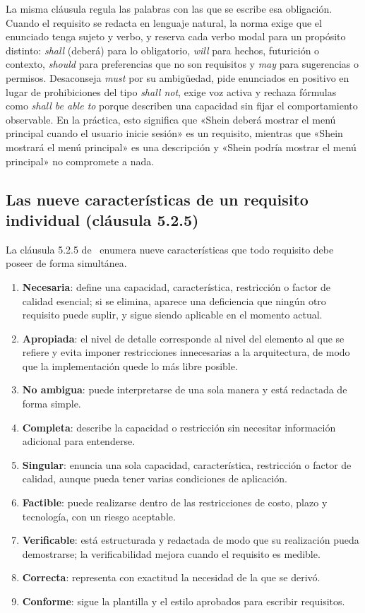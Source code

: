 \documentclass[11pt,a4paper]{article}
\begin{document}
La misma cláusula regula las palabras con las que se escribe esa
obligación. Cuando el requisito se redacta en lenguaje natural, la norma
exige que el enunciado tenga sujeto y verbo, y reserva cada verbo modal
para un propósito distinto: \emph{shall} (deberá) para lo obligatorio,
\emph{will} para hechos, futurición o contexto, \emph{should} para
preferencias que no son requisitos y \emph{may} para sugerencias o
permisos. Desaconseja \emph{must} por su ambigüedad, pide enunciados en
positivo en lugar de prohibiciones del tipo \emph{shall not}, exige voz
activa y rechaza fórmulas como \emph{shall be able to} porque describen una
capacidad sin fijar el comportamiento observable. En la práctica, esto
significa que «Shein deberá mostrar el menú principal cuando el usuario
inicie sesión» es un requisito, mientras que «Shein mostrará el menú
principal» es una descripción y «Shein podría mostrar el menú principal» no
compromete a nada.



\subsection{Las nueve características de un requisito individual (cláusula 5.2.5)}
\label{sec:resumen-525}

La cláusula 5.2.5 de~\cite{iso29148} enumera nueve características que todo
requisito debe poseer de forma simultánea.

\begin{enumerate}[leftmargin=1.4em,itemsep=2pt,topsep=2pt]
\item \textbf{Necesaria}: define una capacidad, característica, restricción
o factor de calidad esencial; si se elimina, aparece una deficiencia que
ningún otro requisito puede suplir, y sigue siendo aplicable en el momento
actual.
\item \textbf{Apropiada}: el nivel de detalle corresponde al nivel del
elemento al que se refiere y evita imponer restricciones innecesarias a la
arquitectura, de modo que la implementación quede lo más libre posible.
\item \textbf{No ambigua}: puede interpretarse de una sola manera y está
redactada de forma simple.
\item \textbf{Completa}: describe la capacidad o restricción sin necesitar
información adicional para entenderse.
\item \textbf{Singular}: enuncia una sola capacidad, característica,
restricción o factor de calidad, aunque pueda tener varias condiciones de
aplicación.
\item \textbf{Factible}: puede realizarse dentro de las restricciones de
costo, plazo y tecnología, con un riesgo aceptable.
\item \textbf{Verificable}: está estructurada y redactada de modo que su
realización pueda demostrarse; la verificabilidad mejora cuando el
requisito es medible.
\item \textbf{Correcta}: representa con exactitud la necesidad de la que se
derivó.
\item \textbf{Conforme}: sigue la plantilla y el estilo aprobados para
escribir requisitos.
\end{enumerate}
\end{document}
